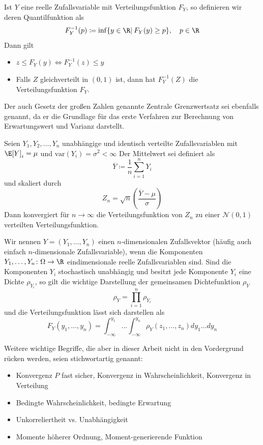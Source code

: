 \begin{maththeorem}[Inversionsmethode]
\label{thinversionsmethode}
Ist $Y$ eine reelle Zufallsvariable mit Verteilungsfunktion $F_Y$, so definieren wir deren Quantilfunktion als
\[F_Y^{-1}(p)\coloneqq \inf\lbrace y\in\R |\: F_Y(y)\ge p\rbrace,\quad p\in\R\]
Dann gilt
\begin{itemize}
\item $z\le F_Y(y)\iff F_Y^{-1}(z)\le y$\\
\item Falls $Z$ gleichverteilt in $(0,1)$ ist, dann hat $F_Y^{-1}(Z)$ die Verteilungsfunktion $F_Y$. 
\end{itemize}
\end{maththeorem}
Der auch Gesetz der großen Zahlen genannte Zentrale Grenzwertsatz sei ebenfalls genannt, da er die Grundlage für das erste Verfahren zur Berechnung von Erwartungswert und Varianz darstellt.
\begin{maththeorem}
\label{thzentralgrenzwert}
Seien $Y_1,Y_2,\dots,Y_n$ unabhängige und identisch verteilte Zufallsvariablen mit $\E[Y]_i=\mu$ und $\text{var}(Y_i)=\sigma^2<\infty$ Der Mittelwert sei definiert als
\[\overline{Y}\coloneqq \frac{1}{n}\sum_{i=1}^nY_i\]
und skaliert durch
\[Z_n=\sqrt{n}\left(\frac{\overline{Y}-\mu}{\sigma}\right)\]
Dann konvergiert für $n\to\infty$ die Verteilungsfunktion von $Z_n$ zu einer $\mathcal{N}(0,1)$ verteilten Verteilungsfunktion.
\end{maththeorem}
\begin{mathdef}[Zufallsvektoren]
Wir nennen $Y=(Y_1,\dots,Y_n)$ einen $n$-dimensionalen Zufallsvektor (häufig auch einfach $n$-dimensionale Zufallsvariable), wenn die Komponenten $Y_1,\dots,Y_n\colon\Omega\to\R$ eindimensionale reelle Zufallsvariablen sind. Sind die Komponenten $Y_i$ stochastisch unabhängig und besitzt jede Komponente $Y_i$ eine Dichte $\rho_{Y_i}$, so gilt die wichtige Darstellung der gemeinsamen Dichtefunktion $\rho_Y$
\[\rho_Y=\prod_{i=1}^n \rho_{Y_i}\]
und die Verteilungsfunktion lässt sich darstellen als
\[F_Y(y_1,\dots,y_n)=\int_{-\infty}^{y_1}\dots\int_{-\infty}^{y_n}\rho_Y(z_1,\dots,z_n)dy_1\dots dy_n\]
\end{mathdef}
Weitere wichtige Begriffe, die aber in dieser Arbeit nicht in den Vordergrund rücken werden, seien stichwortartig genannt:
\begin{itemize}
\item Konvergenz $P$ fast sicher, Konvergenz in Wahrscheinlichkeit, Konvergenz in Verteilung\\
\item Bedingte Wahrscheinlichkeit, bedingte Erwartung
\item Unkorreliertheit vs. Unabhängigkeit
\item Momente höherer Ordnung, Moment-generierende Funktion
\end{itemize}

